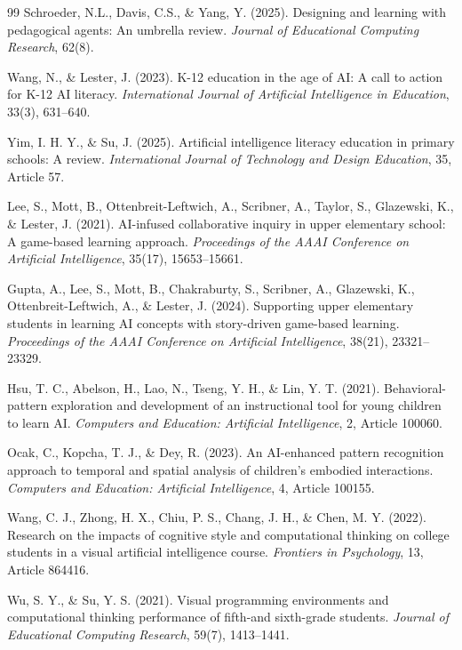 \documentclass[12pt,a4paper,oneside,openany]{report}
\begin{document}
\begin{thebibliography}{99}
Schroeder, N.L., Davis, C.S., \& Yang, Y. (2025). Designing and learning with pedagogical agents: An umbrella review. \textit{Journal of Educational Computing Research}, 62(8).

Wang, N., \& Lester, J. (2023). K-12 education in the age of AI: A call to action for K-12 AI literacy. \textit{International Journal of Artificial Intelligence in Education}, 33(3), 631--640.

Yim, I. H. Y., \& Su, J. (2025). Artificial intelligence literacy education in primary schools: A review. \textit{International Journal of Technology and Design Education}, 35, Article 57.

Lee, S., Mott, B., Ottenbreit-Leftwich, A., Scribner, A., Taylor, S., Glazewski, K., \& Lester, J. (2021). AI-infused collaborative inquiry in upper elementary school: A game-based learning approach. \textit{Proceedings of the AAAI Conference on Artificial Intelligence}, 35(17), 15653--15661.

Gupta, A., Lee, S., Mott, B., Chakraburty, S., Scribner, A., Glazewski, K., Ottenbreit-Leftwich, A., \& Lester, J. (2024). Supporting upper elementary students in learning AI concepts with story-driven game-based learning. \textit{Proceedings of the AAAI Conference on Artificial Intelligence}, 38(21), 23321--23329.

Hsu, T. C., Abelson, H., Lao, N., Tseng, Y. H., \& Lin, Y. T. (2021). Behavioral-pattern exploration and development of an instructional tool for young children to learn AI. \textit{Computers and Education: Artificial Intelligence}, 2, Article 100060.

Ocak, C., Kopcha, T. J., \& Dey, R. (2023). An AI-enhanced pattern recognition approach to temporal and spatial analysis of children's embodied interactions. \textit{Computers and Education: Artificial Intelligence}, 4, Article 100155.

Wang, C. J., Zhong, H. X., Chiu, P. S., Chang, J. H., \& Chen, M. Y. (2022). Research on the impacts of cognitive style and computational thinking on college students in a visual artificial intelligence course. \textit{Frontiers in Psychology}, 13, Article 864416.

Wu, S. Y., \& Su, Y. S. (2021). Visual programming environments and computational thinking performance of fifth-and sixth-grade students. \textit{Journal of Educational Computing Research}, 59(7), 1413--1441.


\end{thebibliography}
\end{document}
